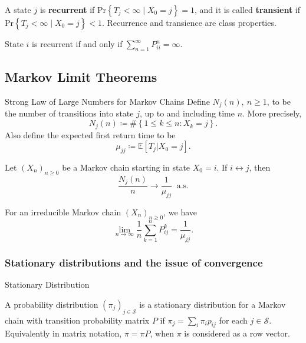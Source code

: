 \begin{idea}{}{}
    A state \( j \) is \textbf{recurrent} if \( \mathrm{Pr} \left\{ T_{j} < \infty  \mid  X _0 = j\right\}   = 1\), and it is called \textbf{transient} if \(  \mathrm{Pr} \left\{ T_{j} < \infty  \mid  X _0 = j\right\}   < 1 \). Recurrence and transience are class properties. 
\end{idea}

\begin{lem}{}{}
State \( i \) is recurrent if and only if \( \sum_{n = 1}^{\infty} P_{ii} ^n = \infty . \) 
\end{lem}

\subsection{Markov Limit Theorems}

\begin{thrm}{Strong Law of Large Numbers for Markov Chains}{}
Define \( N_{j} (n), \ n\geq 1 \), to be the number of transitions into state \( j \), up to and including time \( n \). More precisely, 
\[
    N_{j} (n)\coloneqq \# \left\{ 1\leq k\leq n: X_{k} = j \right\} . 
\]
Also define the expected first return time to be
\[
    \mu _{j j } \coloneqq \mathbb{E} [T_{j} |X_{0}= j ].
\]

Let \( (X_{n} )_{n\geq 0} \) be a Markov chain starting in state \( X_0 = i. \) If \( i \leftrightarrow j \), then
\[
\frac{    N_{j}(n)}{n} \to  \frac{1}{\mu _{j  j}} \ \text{ a.s.}
\] 
\end{thrm}

\begin{cor}{}{}
    For an irreducible Markov chain \( (X_{n} )_{n\geq 0} \),  we have
    \[
        \lim_{n \to \infty} \frac{1}{n}\sum_{k = 1}^n P_{ij}^k = \frac{1}{\mu _{j j }} . 
    \]
\end{cor}


\subsubsection{Stationary distributions and the issue of convergence}

\begin{defn}{Stationary Distribution}{}

    A probability distribution \( (\pi _{j} )_{j \in \mathcal{S}}  \) is a stationary distribution for a Markov chain with transition probability matrix \( P \) if \( \pi _{j}  = \sum_{i} \pi _{i} p _{ij}\) for each \( j \in \mathcal{S}  \). Equivalently in matrix notation, \( \pi  = \pi P\), when \( \pi    \) is considered as a row vector. 

\end{defn}

